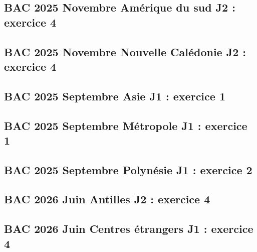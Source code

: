 \documentclass[lang=fr,edition=teacher,layout=sheet]{mxbook}
\begin{document}
\subsection*{BAC 2025 Novembre Amérique du sud J2 : exercice 4}
\begingroup\endgroup
\par\bigskip
{}\subsection*{BAC 2025 Novembre Nouvelle Calédonie J2 : exercice 4}
\begingroup\endgroup
\par\bigskip
{}\subsection*{BAC 2025 Septembre Asie J1 : exercice 1}
\begingroup\endgroup
\par\bigskip
{}\subsection*{BAC 2025 Septembre Métropole J1 : exercice 1}
\begingroup\endgroup
\par\bigskip
{}\subsection*{BAC 2025 Septembre Polynésie J1 : exercice 2}
\begingroup\endgroup
\par\bigskip
{}\subsection*{BAC 2026 Juin Antilles J2 : exercice 4}
\begingroup\endgroup
\par\bigskip
{}\subsection*{BAC 2026 Juin Centres étrangers J1 : exercice 4}
\end{document}
